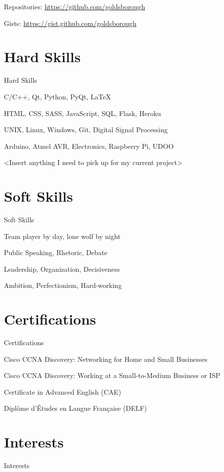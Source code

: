 \begin{body}
\begin{detail}
Repositories: \href{https://github.com/goldsborough}{https://github.com/goldsborough}
\par
Gists: \href{https://gist.github.com/goldsborough}{https://gist.github.com/goldsborough}
\end{detail}



\section{Hard Skills}
{Hard Skills}

C/C++, Qt, Python, PyQt, \LaTeX
\par
HTML, CSS, SASS, JavaScript, SQL, Flask, Heroku
\par
UNIX, Linux, Windows, Git, Digital Signal Processing
\par
Arduino, Atmel AVR, Electronics, Raspberry Pi, UDOO
\par
<Insert anything I need to pick up for my current project>


\section{Soft Skills}
{Soft Skills}

Team player by day, lone wolf by night
\par
Public Speaking, Rhetoric, Debate
\par
Leadership, Organization, Decisiveness
\par
Ambition, Perfectionism, Hard-working


\section{Certifications}
{Certifications}

Cisco CCNA Discovery: Networking for Home and Small Businesses
\par
Cisco CCNA Discovery: Working at a Small-to-Medium Business or ISP
\par
Certificate in Advanced English (CAE)
\par
Dipl\^{o}me d'\'{E}tudes en Langue Fran\c{c}aise (DELF)


\section{Interests}
{Interests}


\end{body}
